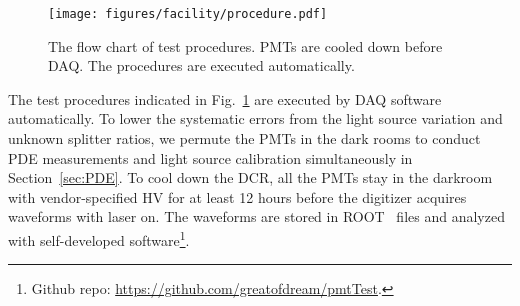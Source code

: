\begin{figure}
    \centering
    \texttt{[image: figures/facility/procedure.pdf]}
    \caption{The flow chart of test procedures. PMTs are cooled down before DAQ. The procedures are executed automatically.}
    \label{fig:testingprocedure}
\end{figure}

The test procedures indicated in Fig.~\ref{fig:testingprocedure} are executed by DAQ software automatically. To lower the systematic errors from the light source variation and unknown splitter ratios, we permute the PMTs in the dark rooms to conduct PDE measurements and light source calibration simultaneously in Section~\ref{sec:PDE}. To cool down the DCR, all the PMTs stay in the darkroom with vendor-specified HV for at least 12 hours before the digitizer acquires waveforms with laser on. The waveforms are stored in ROOT~\cite{brun_root_1997} files and analyzed with self-developed software\footnote{Github repo: \url{https://github.com/greatofdream/pmtTest}.}.
